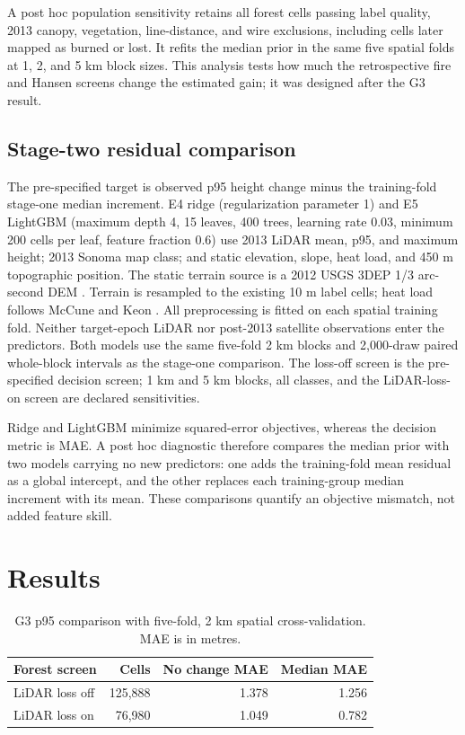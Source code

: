 \documentclass[11pt]{article}
\begin{document}
A post hoc population sensitivity retains all forest cells passing label
quality, 2013 canopy, vegetation, line-distance, and wire exclusions,
including cells later mapped as burned or lost. It refits the median
prior in the same five spatial folds at 1, 2, and 5 km block sizes.
This analysis tests how much the retrospective fire and Hansen screens
change the estimated gain; it was designed after the G3 result.

\subsection{Stage-two residual comparison}
The pre-specified target is observed p95 height change minus the
training-fold stage-one median increment. E4 ridge (regularization
parameter 1) and E5 LightGBM (maximum depth 4, 15 leaves, 400 trees,
learning rate 0.03, minimum 200 cells per leaf, feature fraction 0.6)
use 2013 LiDAR mean, p95, and maximum height; 2013 Sonoma map class;
and static elevation, slope, heat load, and 450 m topographic position.
The static terrain source is a 2012 USGS 3DEP 1/3 arc-second DEM
\cite{usgsdem}. Terrain is resampled to the existing 10 m label cells;
heat load follows McCune and Keon \cite{mccune2002}. All preprocessing
is fitted on each spatial training fold. Neither target-epoch LiDAR nor
post-2013 satellite observations enter the predictors. Both models
use the same five-fold 2 km blocks and 2,000-draw paired whole-block
intervals as the stage-one comparison. The loss-off screen is the
pre-specified decision screen; 1 km and 5 km blocks, all classes, and
the LiDAR-loss-on screen are declared sensitivities.

Ridge and LightGBM minimize squared-error objectives, whereas the
decision metric is MAE. A post hoc diagnostic therefore compares the
median prior with two models carrying no new predictors: one adds the
training-fold mean residual as a global intercept, and the other
replaces each training-group median increment with its mean. These
comparisons quantify an objective mismatch, not added feature skill.

\section{Results}
\begin{table}[ht]
\centering
\caption{G3 p95 comparison with five-fold, 2 km spatial cross-validation.
MAE is in metres.}
\begin{tabular}{lrrr}
\toprule
Forest screen & Cells & No change MAE & Median MAE \\
\midrule
LiDAR loss off & 125,888 & 1.378 & 1.256 \\
LiDAR loss on & 76,980 & 1.049 & 0.782 \\
\bottomrule
\end{tabular}
\end{table}
\end{document}

